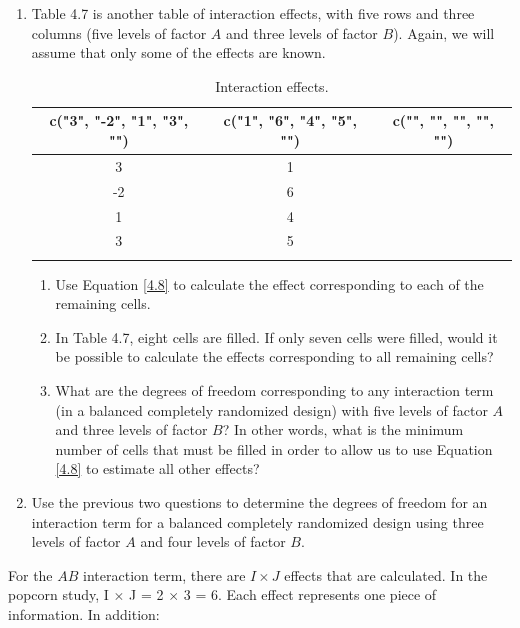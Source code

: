 \documentclass[
]{report}
\begin{document}
\begin{enumerate}
\item Table 4.7 is another table of interaction effects, with five rows and three columns (five levels of factor $\scriptstyle A$ and three levels of factor $\scriptstyle B$). Again, we will assume that only some of the effects are known.

\begin{table}[!h]
\centering
\caption{\label{tab:tab47}Interaction effects.}
\centering
\begin{tabular}[t]{c|c|c}
\hline
c("3", "-2", "1", "3", "") & c("1", "6", "4", "5", "") & c("", "", "", "", "")\\
\hline
3 & 1 & \\
\hline
-2 & 6 & \\
\hline
1 & 4 & \\
\hline
3 & 5 & \\
\hline
 &  & \\
\hline
\end{tabular}
\end{table}

\begin{enumerate}
   \item  Use Equation \ref{4.8} to calculate the effect corresponding to each of the remaining cells.

 \item  In Table 4.7, eight cells are filled. If only seven cells were filled, would it be possible to calculate the effects corresponding to all remaining cells?

 \item  What are the degrees of freedom corresponding to any interaction term (in a balanced completely randomized design) with five levels of factor $\scriptstyle A$ and three levels of factor $\scriptstyle B$? In other words, what is the minimum number of cells that must be filled in order to allow us to use Equation \ref{4.8} to estimate all other effects?

\end{enumerate}

\item Use the previous two questions to determine the degrees of freedom for an interaction term for a balanced completely randomized design using three levels of factor $\scriptstyle A$ and four levels of factor $\scriptstyle B$.
\end{enumerate}

For the \(\scriptstyle AB\) interaction term, there are \(\scriptstyle I \times J\) effects that are calculated. In the popcorn study, I \(\times\) J = 2 \(\times\) 3 = 6. Each effect represents one piece of information. In addition:
\vspace{-1em}
\end{document}
